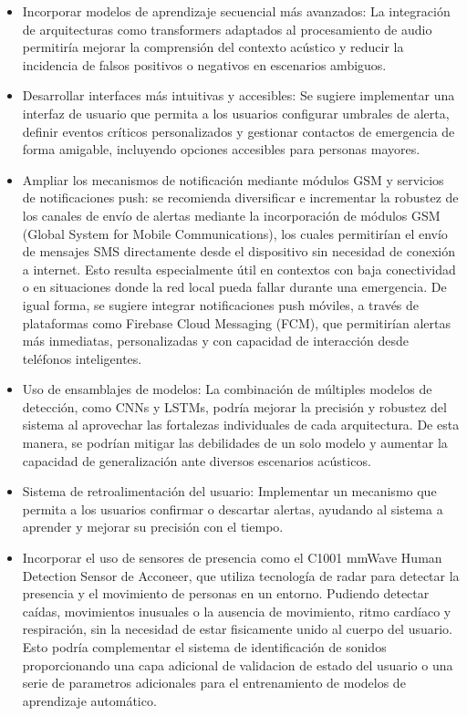 
\begin{itemize}
  \item Incorporar modelos de aprendizaje secuencial más avanzados: La integración de arquitecturas como transformers adaptados al procesamiento de audio permitiría mejorar la comprensión del contexto acústico y reducir la incidencia de falsos positivos o negativos en escenarios ambiguos.
  \item Desarrollar interfaces más intuitivas y accesibles: Se sugiere implementar una interfaz de usuario que permita a los usuarios configurar umbrales de alerta, definir eventos críticos personalizados y gestionar contactos de emergencia de forma amigable, incluyendo opciones accesibles para personas mayores.
  \item Ampliar los mecanismos de notificación mediante módulos GSM y servicios de notificaciones push: se recomienda diversificar e incrementar la robustez de los canales de envío de alertas mediante la incorporación de módulos GSM (Global System for Mobile Communications), los cuales permitirían el envío de mensajes SMS directamente desde el dispositivo sin necesidad de conexión a internet. Esto resulta especialmente útil en contextos con baja conectividad o en situaciones donde la red local pueda fallar durante una emergencia. De igual forma, se sugiere integrar notificaciones push móviles, a través de plataformas como Firebase Cloud Messaging (FCM), que permitirían alertas más inmediatas, personalizadas y con capacidad de interacción desde teléfonos inteligentes.
  \item Uso de ensamblajes de modelos: La combinación de múltiples modelos de detección, como CNNs y LSTMs, podría mejorar la precisión y robustez del sistema al aprovechar las fortalezas individuales de cada arquitectura. De esta manera, se podrían mitigar las debilidades de un solo modelo y aumentar la capacidad de generalización ante diversos escenarios acústicos. 
  \item Sistema de retroalimentación del usuario: Implementar un mecanismo que permita a los usuarios confirmar o descartar alertas, ayudando al sistema a aprender y mejorar su precisión con el tiempo.
  \item Incorporar el uso de sensores de presencia como el C1001 mmWave Human Detection Sensor de Acconeer, que utiliza tecnología de radar para detectar la presencia y el movimiento de personas en un entorno. Pudiendo detectar caídas, movimientos inusuales o la ausencia de movimiento, ritmo cardíaco y respiración, sin la necesidad de estar fisicamente unido al cuerpo del usuario. Esto podría complementar el sistema de identificación de sonidos proporcionando una capa adicional de validacion de estado del usuario o una serie de parametros adicionales para el entrenamiento de modelos de aprendizaje automático.
\end{itemize}